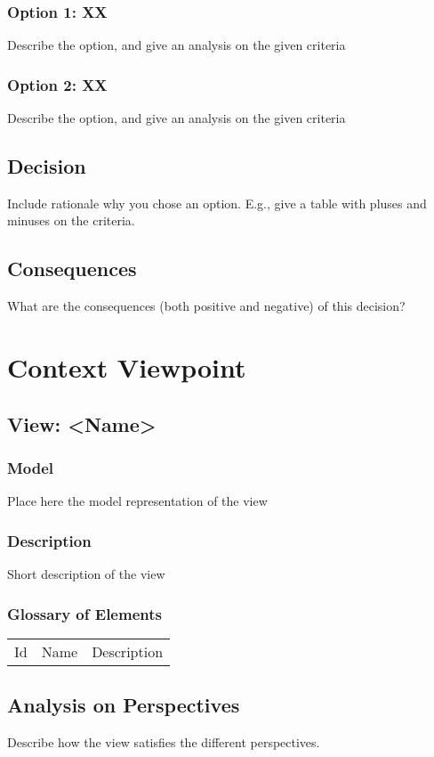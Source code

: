 \documentclass{article}
\begin{document}
\subsubsection*{Option 1: XX}
Describe the option, and give an analysis on the given criteria

\subsubsection*{Option 2: XX}
Describe the option, and give an analysis on the given criteria

\subsection*{Decision}
Include rationale why you chose an option. E.g., give a table with pluses and minuses on the criteria.

\subsection*{Consequences}
What are the consequences (both positive and negative) of this decision?

\section*{Context Viewpoint}
\subsection*{View: \textless{}Name\textgreater{}}
\subsubsection*{Model}
Place here the model representation of the view

\subsubsection*{Description}
Short description of the view

\subsubsection*{Glossary of Elements}
\begin{longtable}{lll}
Id & Name & Description \\
\end{longtable}

\subsection*{Analysis on Perspectives}
Describe how the view satisfies the different perspectives. 
\end{document}
